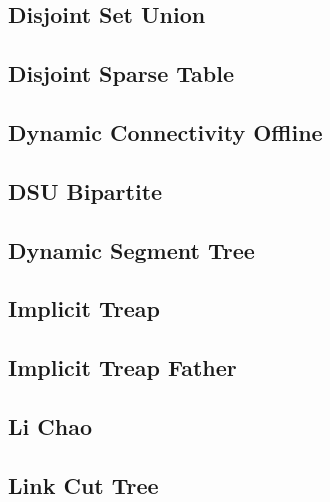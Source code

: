 \subsection{Disjoint Set Union}
\raggedbottom
\hrulefill
\subsection{Disjoint Sparse Table}
\raggedbottom
\hrulefill
\subsection{Dynamic Connectivity Offline}
\raggedbottom
\hrulefill
\subsection{DSU Bipartite}
\raggedbottom
\hrulefill
\subsection{Dynamic Segment Tree}
\raggedbottom
\hrulefill
\subsection{Implicit Treap}
\raggedbottom
\hrulefill
\subsection{Implicit Treap Father}
\raggedbottom
\hrulefill
\subsection{Li Chao}
\raggedbottom
\hrulefill
\subsection{Link Cut Tree}
\raggedbottom
\hrulefill
